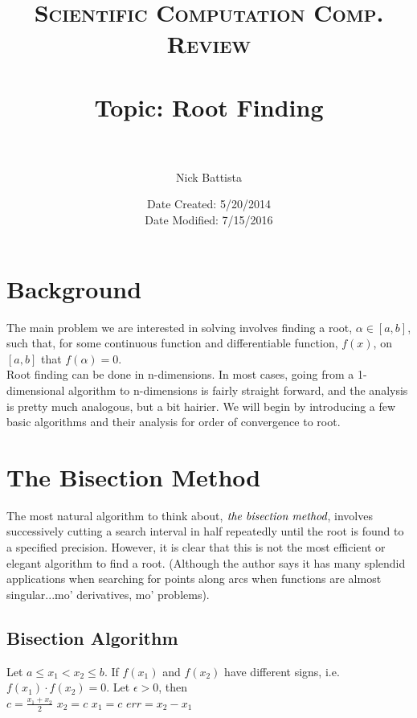 \documentclass[paper=a4, fontsize=11pt]{scrartcl} %
\title{	
\normalfont \normalsize 
\textsc{Scientific Computation Comp. Review} \\ [25pt] %
\horrule{1pt} \\[0.05cm] %
\huge Topic: Root Finding \\ %
\horrule{1pt} \\[0.05cm] %
}
\author{Nick Battista} %
\date{\normalsize Date Created: 5/20/2014 \\ Date Modified: 7/15/2016} %
\numberwithin{equation}{section} %
\numberwithin{figure}{section} %
\numberwithin{table}{section} %
\begin{document}
\maketitle %


\section{Background}

The main problem we are interested in solving involves finding a root, $\alpha\in [a,b]$, such that, for some continuous function and differentiable function, $f(x)$, on $[a,b]$ that $f(\alpha)=0$. \\

Root finding can be done in n-dimensions. In most cases, going from a 1-dimensional algorithm to n-dimensions is fairly straight forward, and the analysis is pretty much analogous, but a bit hairier. We will begin by introducing a few basic algorithms and their analysis for order of convergence to root.\\

\section{The Bisection Method}

The most natural algorithm to think about, $\emph{the bisection method}$, involves successively cutting a search interval in half repeatedly until the root is found to a specified precision. However, it is clear that this is not the most efficient or elegant algorithm to find a root. (Although the author says it has many splendid applications when searching for points along arcs when functions are almost singular...mo' derivatives, mo' problems).  \\

\subsection{Bisection Algorithm}

\begin{algorithmic}

\State Let $a\leq x_{1}<x_{2} \leq b$. If $f(x_1)$ and $f(x_2)$ have different signs, i.e. $f(x_1)\cdot f(x_2)=0$. Let $\epsilon>0$, then \\

	\State $c = \frac{x_1+x_2}{2}$
		\State $x_2 = c$
	\Else 
		\State $x_1 = c$
	\EndIf
	\State $err = x_2-x_1$
\EndWhile

\end{algorithmic}
\end{document}
